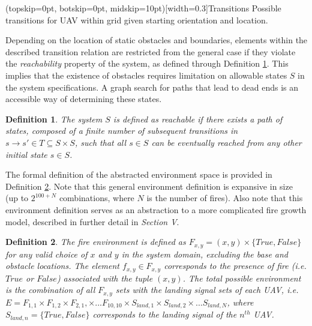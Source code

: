 \documentclass{ieeeaccess}
\newtheorem{definition}{Definition}
\begin{document}
\Figure[t!](topskip=0pt, botskip=0pt, midskip=10pt)[width=0.3\textwidth]{Transitions}
{Possible transitions for UAV within grid given starting orientation and location.\label{transitions}}

Depending on the location of static obstacles and boundaries, elements within the described transition relation are restricted from the general case if they violate the \textit{reachability} property of the system, as defined through Definition \ref{reachable}. This implies that the existence of obstacles requires limitation on allowable states $S$ in the system specifications. A graph search for paths that lead to dead ends is an accessible way of determining these states.

\begin{definition}
	\label{reachable}
	The system $S$ is defined as \textit{reachable} if there exists a path of states, composed of a finite number of subsequent transitions in $s \to s' \in T \subseteq S \times S$, such that all $s \in S$ can be eventually reached from any other initial state $s \in S$.
\end{definition}

The formal definition of the abstracted environment space is provided in Definition \ref{env}. Note that this general environment definition is expansive in size (up to $2^{100+N}$ combinations, where $N$ is the number of fires). Also note that this environment definition serves as an abstraction to a more complicated fire growth model, described in further detail in \textit{Section V}.

\begin{definition}
	\label{env}
	The fire environment is defined as $F_{x,y} = (x, y) \times \{True, False\}$ for any valid choice of $x$ and $y$ in the system domain, excluding the base and obstacle locations. The element $f_{x,y} \in F_{x,y}$ corresponds to the presence of fire (i.e. $True$ or $False$) associated with the tuple $(x,y)$. The total possible environment is the combination of all $F_{x,y}$ sets with the landing signal sets of each UAV, i.e. $E = F_{1,1} \times F_{1,2} \times F_{2,1}, \times ... F_{10,10} \times S_{land,1} \times S_{land,2} \times... S_{land,N}$, where $S_{land, n} = \{True, False\}$ corresponds to the landing signal of the $n^{th}$ UAV.
\end{definition}
\end{document}

